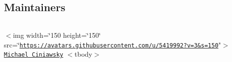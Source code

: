 \subsection*{Maintainers}

\tabulinesep=1mm
\begin{longtabu} spread 0pt [c]{*{0}{|X[-1]}|}
\hline
\end{longtabu}


$<$img width=\char`\"{}150 height=\char`\"{}150\char`\"{}
      src=\char`\"{}\href{https://avatars.githubusercontent.com/u/5419992?v=3&s=150}{\tt https\+://avatars.\+githubusercontent.\+com/u/5419992?v=3\&s=150}"$>$ ~\newline
 \href{https://github.com/michael-ciniawsky}{\tt Michael Ciniawsky}   $<$tbody$>$ 
